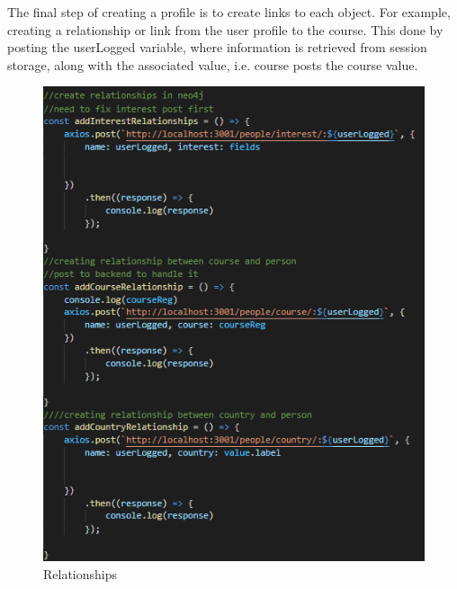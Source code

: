 The final step of creating a profile is to create links to each object. For example, creating a relationship or link from the user profile to the course. This done by posting the userLogged variable, where information is retrieved from session storage, along with the associated value, i.e. course posts the course value.\\
\begin{figure}[H]
    \centering
    \includegraphics{img/register5.png}
    \caption{Relationships} 
    \label{fig:my_label}
\end{figure}

